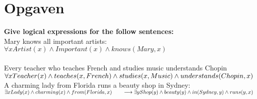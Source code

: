 \documentclass[12pt]{article}
\begin{document}
\maketitle

\section{Opgaven}

\textbf{Give logical expressions for the follow sentences:}\\
Mary knows all important artists:\\
$\forall xArtist(x) \wedge Important(x) \wedge knows(Mary, x)$\\
\\
Every teacher who teaches French and studies music understands Chopin\\
$\forall xTeacher(x) \wedge teaches(x, French) \wedge\\ studies(x, Music) \wedge understands(Chopin, x)$
\\
A charming lady from Florida runs a beauty shop in Sydney:\\
$\exists xLady(x) \wedge charming(x) \wedge  from(Florida,x)\\
\hspace*{2em} \longrightarrow\\
\exists yShop(y) \wedge beauty(y) \wedge in(Sydney, y) \wedge runs(y,x)$
\end{document}
